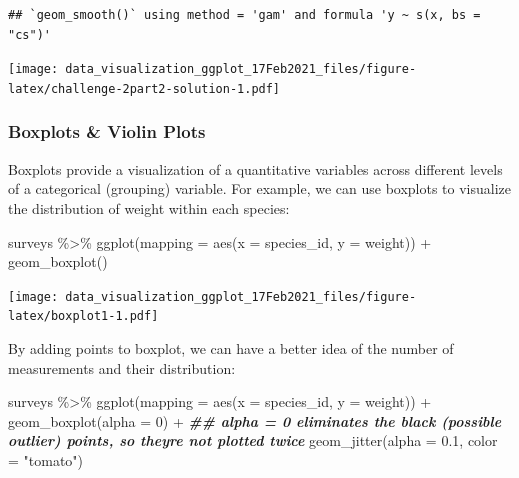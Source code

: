 \documentclass[
]{article}
\newenvironment{Shaded}{\begin{snugshade}}{\end{snugshade}}
\newcommand{\AttributeTok}[1]{\textcolor[rgb]{0.77,0.63,0.00}{#1}}
\newcommand{\DecValTok}[1]{\textcolor[rgb]{0.00,0.00,0.81}{#1}}
\newcommand{\DocumentationTok}[1]{\textcolor[rgb]{0.56,0.35,0.01}{\textbf{\textit{#1}}}}
\newcommand{\FloatTok}[1]{\textcolor[rgb]{0.00,0.00,0.81}{#1}}
\newcommand{\FunctionTok}[1]{\textcolor[rgb]{0.00,0.00,0.00}{#1}}
\newcommand{\NormalTok}[1]{#1}
\newcommand{\SpecialCharTok}[1]{\textcolor[rgb]{0.00,0.00,0.00}{#1}}
\newcommand{\StringTok}[1]{\textcolor[rgb]{0.31,0.60,0.02}{#1}}
\begin{document}
\begin{verbatim}
## `geom_smooth()` using method = 'gam' and formula 'y ~ s(x, bs = "cs")'
\end{verbatim}

\texttt{[image: data\_visualization\_ggplot\_17Feb2021\_files/figure-latex/challenge-2part2-solution-1.pdf]}

\hypertarget{boxplots-violin-plots}{%
\subsubsection{Boxplots \& Violin Plots}\label{boxplots-violin-plots}}

Boxplots provide a visualization of a quantitative variables across
different levels of a categorical (grouping) variable. For example, we
can use boxplots to visualize the distribution of weight within each
species:

\begin{Shaded}
\begin{Highlighting}[]
\NormalTok{surveys }\SpecialCharTok{\%\textgreater{}\%} 
  \FunctionTok{ggplot}\NormalTok{(}\AttributeTok{mapping =} \FunctionTok{aes}\NormalTok{(}\AttributeTok{x =}\NormalTok{ species\_id, }\AttributeTok{y =}\NormalTok{ weight)) }\SpecialCharTok{+}
  \FunctionTok{geom\_boxplot}\NormalTok{()}
\end{Highlighting}
\end{Shaded}

\texttt{[image: data\_visualization\_ggplot\_17Feb2021\_files/figure-latex/boxplot1-1.pdf]}

By adding points to boxplot, we can have a better idea of the number of
measurements and their distribution:

\begin{Shaded}
\begin{Highlighting}[]
\NormalTok{surveys }\SpecialCharTok{\%\textgreater{}\%} 
  \FunctionTok{ggplot}\NormalTok{(}\AttributeTok{mapping =} \FunctionTok{aes}\NormalTok{(}\AttributeTok{x =}\NormalTok{ species\_id, }\AttributeTok{y =}\NormalTok{ weight)) }\SpecialCharTok{+}
  \FunctionTok{geom\_boxplot}\NormalTok{(}\AttributeTok{alpha =} \DecValTok{0}\NormalTok{) }\SpecialCharTok{+} 
  \DocumentationTok{\#\# alpha = 0 eliminates the black (possible outlier) points, so they\textquotesingle{}re not plotted twice}
  \FunctionTok{geom\_jitter}\NormalTok{(}\AttributeTok{alpha =} \FloatTok{0.1}\NormalTok{, }\AttributeTok{color =} \StringTok{"tomato"}\NormalTok{)}
\end{Highlighting}
\end{Shaded}
\end{document}
